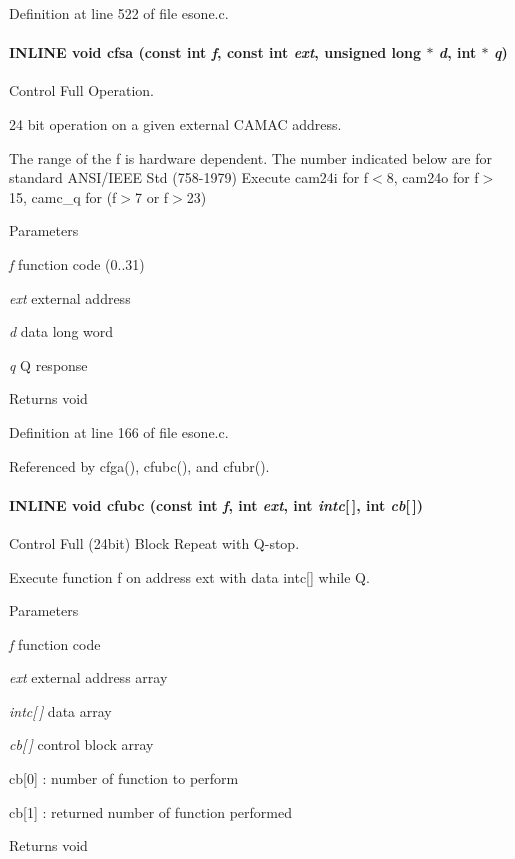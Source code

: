 Definition at line 522 of file esone.c.
\paragraph[{cfsa}]{\setlength{\rightskip}{0pt plus 5cm}INLINE void cfsa (const int {\em f}, \/  const int {\em ext}, \/  unsigned long $\ast$ {\em d}, \/  int $\ast$ {\em q})}\hfill\label{esone_8c_aba3c5f8374e164372dca164835f36217}
Control Full Operation.

24 bit operation on a given external CAMAC address.

The range of the f is hardware dependent. The number indicated below are for standard ANSI/IEEE Std (758-\/1979) Execute cam24i for f$<$8, cam24o for f$>$15, camc\_\-q for (f$>$7 or f$>$23)


\begin{DoxyParams}{Parameters}
\item[{\em f}]function code (0..31) \item[{\em ext}]external address \item[{\em d}]data long word \item[{\em q}]Q response \end{DoxyParams}
\begin{DoxyReturn}{Returns}
void 
\end{DoxyReturn}


Definition at line 166 of file esone.c.

Referenced by cfga(), cfubc(), and cfubr().
\paragraph[{cfubc}]{\setlength{\rightskip}{0pt plus 5cm}INLINE void cfubc (const int {\em f}, \/  int {\em ext}, \/  int {\em intc}\mbox{[}$\,$\mbox{]}, \/  int {\em cb}\mbox{[}$\,$\mbox{]})}\hfill\label{esone_8c_ae8137d2fe1de67c4160f926d04662da0}
Control Full (24bit) Block Repeat with Q-\/stop.

Execute function f on address ext with data intc\mbox{[}\mbox{]} while Q.


\begin{DoxyParams}{Parameters}
\item[{\em f}]function code \item[{\em ext}]external address array \item[{\em intc\mbox{[}$\,$\mbox{]}}]data array \item[{\em cb\mbox{[}$\,$\mbox{]}}]control block array \par
 cb\mbox{[}0\mbox{]} : number of function to perform \par
 cb\mbox{[}1\mbox{]} : returned number of function performed \end{DoxyParams}
\begin{DoxyReturn}{Returns}
void 
\end{DoxyReturn}


